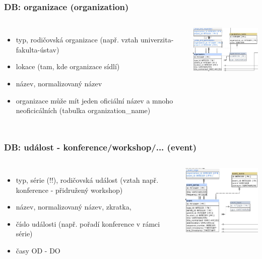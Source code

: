 \documentclass{beamer}
\begin{document}
\begin{frame}
  \frametitle{DB: organizace (organization)}
  \begin{columns}
      \fontsize{9pt}{11pt}\selectfont
      \begin{itemize}
        \item typ, rodičovská organizace (např. vztah univerzita-fakulta-ústav)
        \item lokace (tam, kde organizace sídlí)
        \item název, normalizovaný název
        \item organizace může mít jeden oficiální název a mnoho neoficicálních (tabulka organization\_name)
      \end{itemize}
      \includegraphics[width=6cm]{rrs_db_orga.jpeg}
  \end{columns}
\end{frame}

\begin{frame}
  \frametitle{DB: událost - konference/workshop/... (event)}
  \begin{columns}
      \fontsize{10pt}{11pt}\selectfont
      \begin{itemize}
        \item typ, série (!!), rodičovská událost (vztah např. konference - přidružený workshop)
        \item název, normalizovaný název, zkratka, 
        \item číslo události (např. pořadí konference v rámci série)
        \item časy OD - DO
      \end{itemize}
      \includegraphics[width=6cm]{rrs_db_even.jpeg}
  \end{columns}
\end{frame}
\end{document}
